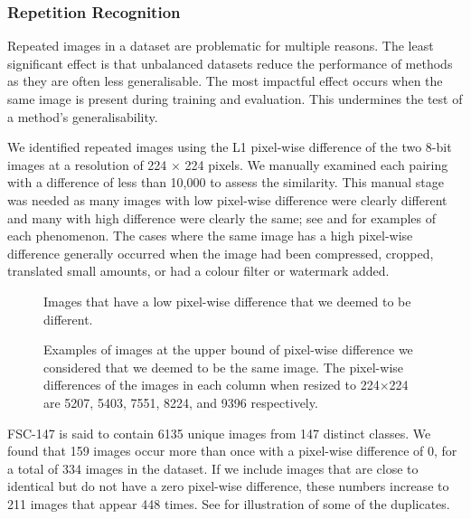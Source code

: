 \documentclass[../thesis.tex]{subfiles}
\begin{document}
\subsubsection{Repetition Recognition}
Repeated images in a dataset are problematic for multiple reasons.
The least significant effect is that unbalanced datasets reduce the performance of methods as they are often less generalisable. The most impactful effect occurs when the same image is present during training and evaluation. This undermines the test of a method's generalisability.

We identified repeated images using the L1 pixel-wise difference of the two 8-bit images at a resolution of 224 $\times$ 224 pixels. We manually examined each pairing with a difference of less than 10,000 to assess the similarity. 
This manual stage was needed as many images with low pixel-wise difference were clearly different and many with high difference were clearly the same; see  and  for examples of each phenomenon. 
The cases where the same image has a high pixel-wise difference generally occurred when the image had been compressed, cropped, translated small amounts, or had a colour filter or watermark added.


\begin{figure}   
    \centering
    
    \caption{Images that have a low pixel-wise difference that we deemed to be different.}
    \label{fig__FSC133ure__no_similar}
\end{figure}

\begin{figure}
    \centering
    
    \caption{Examples of images at the upper bound of pixel-wise difference we considered that we deemed to be the same image. The pixel-wise differences of the images in each column when resized to 224$\times$224 are 5207, 5403, 7551, 8224, and 9396 respectively.}
    \label{fig__FSC133__similar}
\end{figure}


FSC-147 is said to contain 6135 unique images from 147 distinct classes. 
We found that 159 images occur more than once with a pixel-wise difference of 0, for a total of 334 images in the dataset.
If we include images that are close to identical but do not have a zero pixel-wise difference, these numbers increase to 211 images that appear 448 times.
See  for illustration 
of some of the duplicates.
\end{document}
